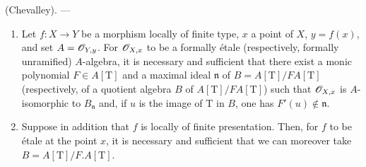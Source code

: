 \begin{theorem}[18.4.6]
\label{IV.18.4.6}
(Chevalley). ---
\begin{enumerate}
  \item[(i)] Let $f:X\to Y$ be a morphism locally of finite type, $x$ a point of $X$, $y=f(x)$, and set $A=\mathscr{O}_{Y,y}$.
For $\mathscr{O}_{X,x}$ to be a formally \'etale (respectively, formally unramified) $A$-algebra, it is necessary and sufficient that there exist a monic polynomial $F\in A[\mathrm{T}]$ and a maximal ideal $\mathfrak{n}$ of $B=A[\mathrm{T}]/F A[\mathrm{T}]$ (respectively, of a quotient algebra $B$ of $A[\mathrm{T}]/F A[\mathrm{T}]$) such that $\mathscr{O}_{X,x}$ is $A$-isomorphic to $B_\mathfrak{n}$ and, if $u$ is the image of $\mathrm{T}$ in $B$, one has $F'(u)\notin\mathfrak{n}$.
  \item[(ii)] Suppose in addition that $f$ is locally of finite presentation.
Then, for $f$ to be \'etale at the point $x$, it is necessary and sufficient that we can moreover take $B=A[\mathrm{T}]/F.A[\mathrm{T}]$.
\end{enumerate}
\end{theorem}

